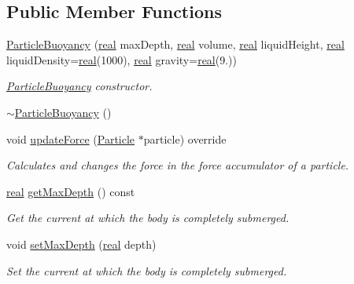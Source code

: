 \subsection*{Public Member Functions}
\begin{DoxyCompactItemize}
\item 
\mbox{\hyperlink{classr3_1_1_particle_buoyancy_a32db81f5aba8e5d2a6990c56074e1557}{Particle\+Buoyancy}} (\mbox{\hyperlink{namespacer3_ab2016b3e3f743fb735afce242f0dc1eb}{real}} max\+Depth, \mbox{\hyperlink{namespacer3_ab2016b3e3f743fb735afce242f0dc1eb}{real}} volume, \mbox{\hyperlink{namespacer3_ab2016b3e3f743fb735afce242f0dc1eb}{real}} liquid\+Height, \mbox{\hyperlink{namespacer3_ab2016b3e3f743fb735afce242f0dc1eb}{real}} liquid\+Density=\mbox{\hyperlink{namespacer3_ab2016b3e3f743fb735afce242f0dc1eb}{real}}(1000), \mbox{\hyperlink{namespacer3_ab2016b3e3f743fb735afce242f0dc1eb}{real}} gravity=\mbox{\hyperlink{namespacer3_ab2016b3e3f743fb735afce242f0dc1eb}{real}}(9.))
\begin{DoxyCompactList}\small\item\em \mbox{\hyperlink{classr3_1_1_particle_buoyancy}{Particle\+Buoyancy}} constructor. \end{DoxyCompactList}\item 
\mbox{\hyperlink{classr3_1_1_particle_buoyancy_a9ebaf421f758cf01ce164f679cb5c4c0}{$\sim$\+Particle\+Buoyancy}} ()
\item 
void \mbox{\hyperlink{classr3_1_1_particle_buoyancy_afb3fc83d65052567b972e139ce167995}{update\+Force}} (\mbox{\hyperlink{classr3_1_1_particle}{Particle}} $\ast$particle) override
\begin{DoxyCompactList}\small\item\em Calculates and changes the force in the force accumulator of a particle. \end{DoxyCompactList}\item 
\mbox{\hyperlink{namespacer3_ab2016b3e3f743fb735afce242f0dc1eb}{real}} \mbox{\hyperlink{classr3_1_1_particle_buoyancy_a7f0929df70102df213722afdd511cf68}{get\+Max\+Depth}} () const
\begin{DoxyCompactList}\small\item\em Get the current at which the body is completely submerged. \end{DoxyCompactList}\item 
void \mbox{\hyperlink{classr3_1_1_particle_buoyancy_a09b780ceb66884f0381da22ed9f35b83}{set\+Max\+Depth}} (\mbox{\hyperlink{namespacer3_ab2016b3e3f743fb735afce242f0dc1eb}{real}} depth)
\begin{DoxyCompactList}\small\item\em Set the current at which the body is completely submerged. \end{DoxyCompactList}\item 

\end{DoxyCompactItemize}
